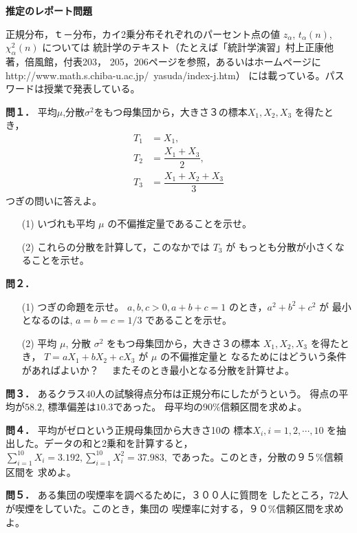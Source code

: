 \documentclass[a4paper]{jarticle}
\begin{document}
\begin{center}
   {\large\bf 推定のレポート問題}
\end{center}
正規分布，ｔ－分布，カイ2乗分布それぞれのパーセント点の値
$z_{\alpha}$, $t_{\alpha}(n)$, $\chi_{\alpha}^2(n)$ については
統計学のテキスト（たとえば「統計学演習」村上正康他著，倍風館，付表203，
205，206ページを参照，あるいはホームページに
http://www.math.s.chiba-u.ac.jp/~yasuda/index-j.htm）
には載っている。パスワードは授業で発表している。


\vspace{2ex}

{\bf 問１．} \hspace{0.5em}
平均$\mu$,分散$\sigma^2$をもつ母集団から，大きさ３の標本$X_1,X_2,X_3$
を得たとき，
$$
\begin{array}{ll}
  T_1 & = X_1, \\
  T_2 & = \dfrac{X_1+X_3}{2}, \\
  T_3 & = \dfrac{X_1+X_2+X_3}{3} 
\end{array}
$$
つぎの問いに答えよ。
\begin{itemize}
  \item[(1)]
   いづれも平均 $\mu$ の不偏推定量であることを示せ。
  \item[(2)]
   これらの分散を計算して，このなかでは $T_3$ が
   もっとも分散が小さくなることを示せ。
\end{itemize}


\vfil

{\bf 問２．} \hspace{0.5em}
\begin{itemize}
 \item[(1)] つぎの命題を示せ。
   $a,b,c > 0, a + b + c = 1 $ のとき，$a^2 + b^2 + c^2 $ が
   最小となるのは, $a= b= c= 1/3$ であることを示せ。
 \item[(2)]
   平均 $\mu$, 分散 $\sigma^2$ をもつ母集団から，大きさ３の標本
   $X_1,X_2,X_3$ を得たとき，
   $ T = a X_1 + b X_2 + c X_3$ 
   が $\mu$ の不偏推定量と
   なるためにはどういう条件があればよいか？　
   またそのとき最小となる分散を計算せよ。
\end{itemize}

\vfil

{\bf 問３．} \hspace{0.5em}
あるクラス$40$人の試験得点分布は正規分布にしたがうという。
得点の平均が$58.2$, 標準偏差は$10.3$であった。
母平均の$90\%$信頼区間を求めよ。

\vfil

{\bf 問４．} \hspace{0.5em}
平均がゼロという正規母集団から大きさ10の
標本$X_i,i=1,2,\cdots,10$
を抽出した。データの和と2乗和を計算すると，
$\sum_{i=1}^{10} X_i = 3.192,
\sum_{i=1}^{10} X_i^2 = 37.983,$
であった。このとき，分散の９５\%信頼区間を
求めよ。


\vfil

{\bf 問５．} \hspace{0.5em}
ある集団の喫煙率を調べるために，３００人に質問を
したところ，72人が喫煙をしていた。このとき，集団の
喫煙率に対する，９０\%信頼区間を求めよ。

\vfil
\end{document}

